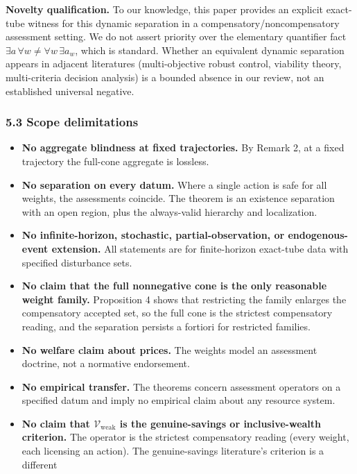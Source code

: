 \documentclass[11pt]{article}
\providecommand{\tightlist}{\setlength{\itemsep}{0pt}\setlength{\parskip}{0pt}}
\begin{document}
\textbf{Novelty qualification.} To our knowledge, this paper provides an
explicit exact-tube witness for this dynamic separation in a
compensatory/noncompensatory assessment setting. We do not assert
priority over the elementary quantifier fact
\(\exists a\, \forall w \neq \forall w\, \exists a_w\), which is
standard. Whether an equivalent dynamic separation appears in adjacent
literatures (multi-objective robust control, viability theory,
multi-criteria decision analysis) is a bounded absence in our review,
not an established universal negative.

\subsubsection{5.3 Scope delimitations}\label{scope-delimitations}

\begin{itemize}
\tightlist
\item
  \textbf{No aggregate blindness at fixed trajectories.} By Remark 2, at a fixed trajectory the full-cone aggregate is lossless.
\item
  \textbf{No separation on every datum.} Where a single action is safe
  for all weights, the assessments coincide. The theorem is an existence
  separation with an open region, plus the always-valid hierarchy and
  localization.
\item
  \textbf{No infinite-horizon, stochastic, partial-observation, or
  endogenous-event extension.} All statements are for finite-horizon exact-tube data with specified disturbance sets.
\item
  \textbf{No claim that the full nonnegative cone is the only reasonable
  weight family.} Proposition 4 shows that restricting the family
  enlarges the compensatory accepted set, so the full cone is the strictest compensatory reading, and the separation persists a fortiori for restricted families.
\item
  \textbf{No welfare claim about prices.} The weights model an
  assessment doctrine, not a normative endorsement.
\item
  \textbf{No empirical transfer.} The theorems concern assessment operators on a specified datum and imply no empirical claim about any resource system.
\item
  \textbf{No claim that \(\mathcal{V}_{\mathrm{weak}}\) is the
  genuine-savings or inclusive-wealth criterion.} The operator is the
  strictest compensatory reading (every weight, each licensing an
  action). The genuine-savings literature's criterion is a different

\end{itemize}
\end{document}
